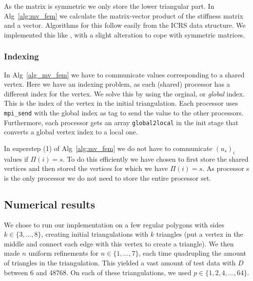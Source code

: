 \documentclass[11pt]{amsart}
\theoremstyle{definition}
\begin{document}
As the matrix is symmetric we only store the lower triangular part. In Alg~\ref{alg:mv_fem}
we calculate the matrix-vector product of the stiffness matrix and a vector. Algorithms for this
follow easily from the ICRS data structure. We implemented this like \cite[Algorithm~4.4]{biss04}, with
a slight alteration to cope with symmetric matrices.

\subsubsection{Indexing}
In Alg~\ref{alg_mv_fem} we have to communicate values corresponding to a shared vertex. Here we have an indexing problem, as each (shared) processor has a different index for the vertex. We solve this by using the orginal, or \emph{global} index. This is the index of the vertex in the initial triangulation. Each processor uses \verb=mpi_send= with the global index as tag to send the value to the other processors. Furthermore, each processor gets an array \verb=global2local= in the init stage that converts a global vertex index to a local one.


In superstep (1) of Alg~\ref{alg:mv_fem} we do not have to communicate $(u_s)_i$ values if $\Pi(i) = s$. To do this efficiently we have chosen to first store the shared vertices and then stored the vertices for which we have $\Pi(i)=s$. As processor s is the only processor we do not need to store the entire processor set.

\subsection{Numerical results}
We chose to run our implementation on a few regular polygons with sides $k \in \{3, \ldots, 8\}$, creating initial triangulations with $k$ triangles (put a vertex in the middle and connect each edge with this vertex to create a triangle). We then made $n$ uniform refinements for $n \in \{1, \ldots, 7\}$, each time quadrupling the amount of triangles in the triangulation. This yielded a vast amount of test data with $D$ between 6 and 48768. On each of these triangulations, we used $p \in \{1, 2, 4, \ldots, 64\}$.
\end{document}
